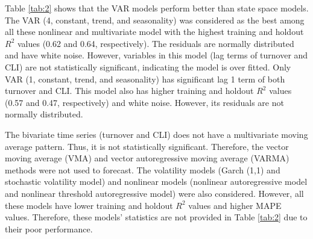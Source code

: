 Table \ref{tab:2} shows that the VAR models perform better than state space models. The VAR (4, constant, trend, and seasonality) was considered as the best among all these nonlinear and multivariate model with the highest training and holdout $R^2$ values (0.62 and 0.64, respectively). The residuals are normally distributed and have white noise. However, variables in this model (lag terms of turnover and CLI) are not statistically significant, indicating the model is over fitted. Only VAR (1, constant, trend, and seasonality) has significant lag 1 term  of both turnover and CLI. This model also has higher training and holdout $R^2$ values (0.57 and 0.47, respectively) and white noise. However, its residuals are not normally distributed. 
 
The bivariate time series (turnover and CLI) does not have a multivariate moving average pattern. Thus, it is not  statistically significant. Therefore, the vector moving average (VMA) and vector autoregressive moving average (VARMA) methods were not used to forecast. The volatility models (Garch (1,1) and stochastic volatility model) and nonlinear models (nonlinear autoregressive model and nonlinear threshold autoregressive model) were also considered. However, all these models have lower training and holdout $R^2$ values and higher MAPE values. Therefore, these models' statistics are not provided in Table \ref{tab:2} due to their poor performance.
